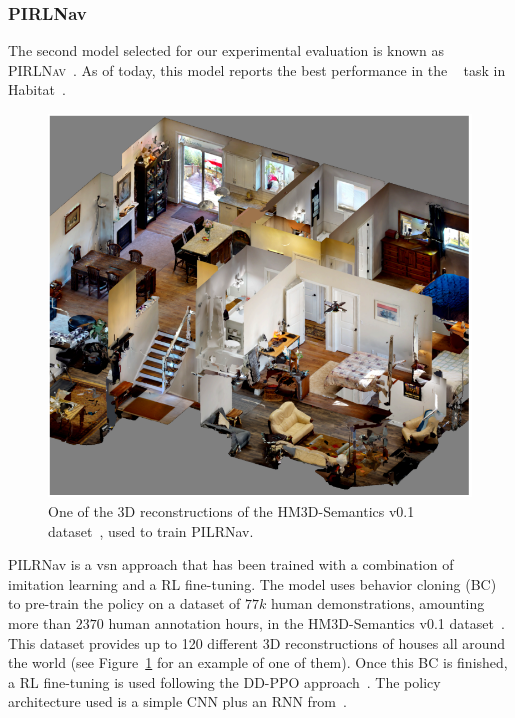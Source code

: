 \subsubsection{PIRLNav}
The second model selected for our experimental evaluation is known as \textsc{PIRLNav}~\cite{ramrakhya2023}.
As of today, this model reports the best performance in the \objnav~\cite{batra2020} task in Habitat~\cite{NEURIPS2021_021bbc7e}.

\begin{figure}[t]
    \centering
    \includegraphics[width=\linewidth]{figures/ros4vsn/dataset_scene}
    \caption{One of the 3D reconstructions of the HM3D-Semantics v0.1 dataset~\cite{Ramakrishnan2021HabitatMatterport3D}, used to train PILRNav.}
    \label{fig:scene_hm3d}
\end{figure}

PILRNav is a \acrshort{vsn} approach that has been trained with a combination of imitation learning and a RL fine-tuning.
The model uses behavior cloning (BC) to pre-train the \objnav policy on a dataset of $77k$ human demonstrations, amounting more than $2370$ human annotation hours, in the HM3D-Semantics v0.1 dataset~\cite{Ramakrishnan2021HabitatMatterport3D}.
This dataset provides up to 120 different 3D reconstructions of houses all around the world (see Figure~\ref{fig:scene_hm3d} for an example of one of them).
Once this BC is finished, a RL fine-tuning is used following the DD-PPO approach~\cite{Wijmans2019DDPPOLN}.
The policy architecture used is a simple CNN plus an RNN from~\cite{yadav2022}.

